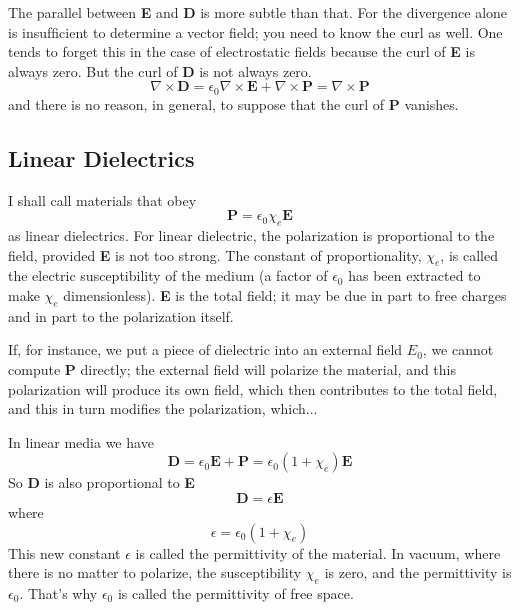\documentclass[../../../main.tex]{subfiles}
\begin{document}
The parallel between \textbf{E} and \textbf{D} is more subtle than that. For the divergence alone is insufﬁcient to determine a vector ﬁeld; you need to know the curl as well. One tends to forget this in the case of electrostatic ﬁelds  because the curl of \textbf{E} is always zero. But the curl of \textbf{D} is not always zero.
\begin{equation*}
    \nabla\times\mathbf{D}=\epsilon_0\nabla\times\mathbf{E}+\nabla\times\mathbf{P}= \nabla\times\mathbf{P}
\end{equation*}
and there is no reason, in general, to suppose that the curl of \textbf{P} vanishes.

\subsection*{Linear Dielectrics}
I shall call materials that obey
\begin{equation*}
    \mathbf{P}=\epsilon_0\chi_e\mathbf{E}
\end{equation*}
as linear dielectrics. For linear dielectric, the polarization is proportional to the ﬁeld, provided \textbf{E} is not too strong. The constant of proportionality, $\chi_e$, is called the electric susceptibility of the medium (a factor of $\epsilon_0$ has been extracted to make $\chi_e$ dimensionless). \textbf{E} is the total ﬁeld; it may be due in part to free charges and in part to the polarization itself. 

If, for instance, we put a piece of dielectric into an external ﬁeld $E_0$, we cannot compute \textbf{P} directly; the external ﬁeld will polarize the material, and this polarization will produce its own ﬁeld, which then contributes to the total ﬁeld, and this in turn modiﬁes the polarization, which...

In linear media we have
\begin{equation*}
    \mathbf{D}=\epsilon_0\mathbf{E}+\mathbf{P}=\epsilon_0(1+\chi_e)\mathbf{E}
\end{equation*}
So \textbf{D} is also proportional to \textbf{E}
\begin{equation*}
    \mathbf{D}=\epsilon\mathbf{E}
\end{equation*}
where
\begin{equation*}
    \epsilon=\epsilon_0(1+\chi_e)
\end{equation*}
This new constant $\epsilon$ is called the permittivity of the material. In vacuum, where there is no matter to polarize, the susceptibility $\chi_e$ is zero, and the permittivity is $\epsilon_0$. That’s why $\epsilon_0$ is called the permittivity of free space. 
\end{document}
